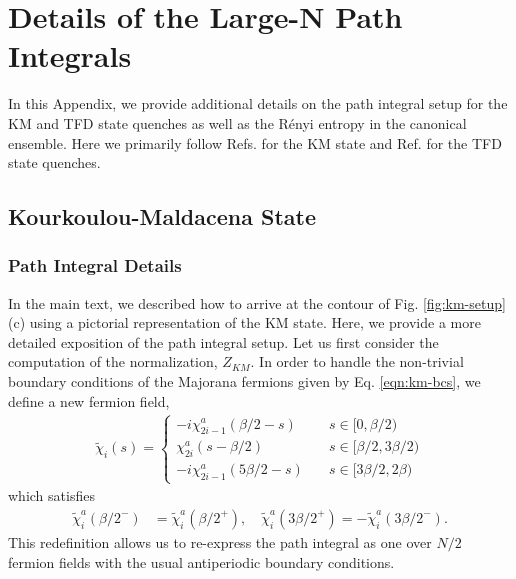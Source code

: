 \documentclass[reprint, floatfix,eqsecnum,superscriptaddress,preprint,nofootinbib,onecolumn,amsmath,amssymb,aps,prb]{revtex4-2}
\newcommand{\tchi}{\tilde{\chi}}
\begin{document}
\section{Details of the Large-N Path Integrals \label{app:discretization} }

In this Appendix, we provide additional details on the path integral setup for the KM and TFD state quenches as well as the R\'enyi entropy in the canonical ensemble. %
Here we primarily follow Refs. \cite{Zhang2020a,Liu2020} for the KM state and Ref. \cite{Chen2020} for the TFD state quenches.

\subsection{Kourkoulou-Maldacena State}

\subsubsection{Path Integral Details}

In the main text, we described how to arrive at the contour of Fig. \ref{fig:km-setup}(c) using a pictorial representation of the KM state. 
Here, we provide a more detailed exposition of the path integral setup. Let us first consider the computation of the normalization, $Z_{KM}$. In order to handle the non-trivial boundary conditions of the Majorana fermions given by Eq. \eqref{eqn:km-bcs}, we define a new fermion field, 
\begin{align}
	\tilde{\chi}_i(s) = \begin{cases}
	    -i\chi_{2i-1}^a(\beta/2 - s) \quad & s \in [0 , \beta/2) \\
		\chi_{2i}^a(s-\beta / 2) \quad & s \in [\beta/2,3\beta/2) \\
		-i\chi_{2i-1}^a(5\beta/2 - s) \quad & s \in [3\beta/2 , 2\beta)
	\end{cases}
\end{align}
which satisfies
\begin{align}
    \tchi^a_i(\beta/2^-) &= \tchi^a_i(\beta/2^+), \quad 
    \tchi^a_i(3\beta/2^+) = -\tchi^a_i(3\beta/2^-).
\end{align}
This redefinition allows us to re-express the path integral as one over $N/2$ fermion fields with the usual antiperiodic boundary conditions. 
\end{document}
